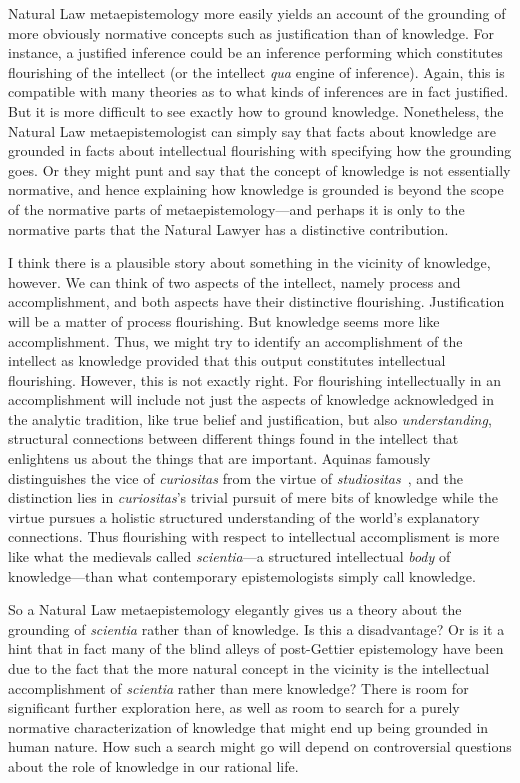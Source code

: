 Natural Law metaepistemology more easily yields an account of the grounding of more obviously normative concepts such as 
justification than of knowledge. For instance, a justified inference could be an inference performing which constitutes flourishing of the intellect
(or the intellect \textit{qua} engine of inference). Again, this is compatible with many theories as to what kinds of inferences
are in fact justified. But it is more difficult to see exactly how to ground knowledge. Nonetheless, the Natural Law metaepistemologist
can simply say that facts about knowledge are grounded in facts about intellectual flourishing with specifying how the grounding
goes.  Or they might punt and say that the concept of knowledge is not essentially normative, and hence explaining how knowledge is
grounded is beyond the scope of the normative parts of metaepistemology---and perhaps it is only to the normative parts that the
Natural Lawyer has a distinctive contribution.

I think there is a plausible story about something in the vicinity of knowledge, however. We can think of two aspects of the
intellect, namely process and accomplishment, and both aspects have their distinctive flourishing. Justification will be a matter of
process flourishing. But knowledge seems more like accomplishment. Thus, we might try to identify an accomplishment of the intellect as 
knowledge provided that this output constitutes intellectual flourishing. However, this is not exactly right. For flourishing
intellectually in an accomplishment will include not just the aspects of knowledge acknowledged in the analytic tradition, like true 
belief and justification, but also \textit{understanding}, structural connections between different things found in the intellect that
enlightens us about the things that are important. Aquinas famously distinguishes the vice of \textit{curiositas} from the virtue of
\textit{studiositas}~\parencite[II-II, 166--167]{AquinasST}, and the distinction lies in \textit{curiositas}'s trivial pursuit of mere bits of knowledge while the virtue pursues a holistic
structured understanding of the world's explanatory connections. Thus flourishing with respect to intellectual accomplisment is more
like what the medievals called \textit{scientia}---a structured intellectual \textit{body} of knowledge---than what 
contemporary epistemologists simply call knowledge.

So a Natural Law metaepistemology elegantly gives us a theory about the grounding of \textit{scientia} rather than of knowledge. 
Is this a disadvantage? Or is it a hint that in fact many of the blind alleys of post-Gettier epistemology have been due to the
fact that the more natural concept in the vicinity is the intellectual accomplishment of \textit{scientia} rather than mere 
knowledge?  There is room for significant further exploration here, as well as room to search for a purely normative characterization
of knowledge that might end up being grounded in human nature. How such a search might go will depend on controversial questions about
the role of knowledge in our rational life. 

